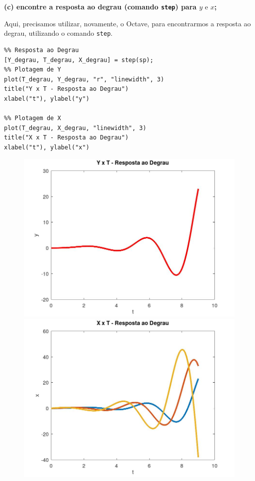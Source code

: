 \documentclass[11pt]{article}
\begin{document}
\textbf{(c) encontre a resposta ao degrau (comando \texttt{step}) para $y \text{ e } x$;}

Aqui, precisamos utilizar, novamente, o Octave, para encontrarmos a resposta ao degrau, utilizando o comando \texttt{step}.
\begin{verbatim}
%% Resposta ao Degrau
[Y_degrau, T_degrau, X_degrau] = step(sp);
%% Plotagem de Y
plot(T_degrau, Y_degrau, "r", "linewidth", 3)
title("Y x T - Resposta ao Degrau")
xlabel("t"), ylabel("y")

%% Plotagem de X
plot(T_degrau, X_degrau, "linewidth", 3)
title("X x T - Resposta ao Degrau")
xlabel("t"), ylabel("x")
\end{verbatim}

\begin{center}
\begin{figure}[h]
\begin{minipage}[!]{0.5\linewidth}
  \includegraphics[scale=0.3]{plot1c1.jpg}
\end{minipage}
\begin{minipage}[!]{0.5\linewidth}
  \includegraphics[scale=0.3]{plot1c2.jpg}
\end{minipage}
\end{figure}
\end{center}
\end{document}
